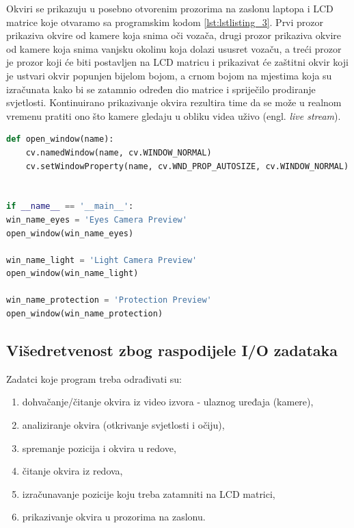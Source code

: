 \documentclass{foi}
\begin{document}
Okviri se prikazuju u posebno otvorenim prozorima na zaslonu laptopa i LCD matrice koje otvaramo sa programskim kodom \ref{lst:lstlisting_3}. Prvi prozor prikaziva okvire od kamere koja snima oči vozača, drugi prozor prikaziva okvire od kamere koja snima vanjsku okolinu koja dolazi ususret vozaču, a treći prozor je prozor koji će biti postavljen na LCD matricu i prikazivat će zaštitni okvir koji je ustvari okvir popunjen bijelom bojom, a crnom bojom na mjestima koja su izračunata kako bi se zatamnio određen dio matrice i spriječilo prodiranje svjetlosti. Kontinuirano prikazivanje okvira rezultira time da se može u realnom vremenu pratiti ono što kamere gledaju u obliku videa uživo (engl. \emph{live stream}).

\newpage
\begin{lstlisting}[language=Python, label={lst:lstlisting_3}, firstnumber=142, style=colored, caption=Otvaranje prozora na zaslonu]
def open_window(name):
    cv.namedWindow(name, cv.WINDOW_NORMAL)
    cv.setWindowProperty(name, cv.WND_PROP_AUTOSIZE, cv.WINDOW_NORMAL)


if __name__ == '__main__':
win_name_eyes = 'Eyes Camera Preview'
open_window(win_name_eyes)

win_name_light = 'Light Camera Preview'
open_window(win_name_light)

win_name_protection = 'Protection Preview'
open_window(win_name_protection)
\end{lstlisting}

\subsection{Višedretvenost zbog raspodijele I/O zadataka}

\flushleft Zadatci koje program treba odrađivati su:
\begin{enumerate}[noitemsep]
    \item dohvačanje/čitanje okvira iz video izvora - ulaznog uređaja (kamere),
    \item analiziranje okvira (otkrivanje svjetlosti i očiju),
    \item spremanje pozicija i okvira u redove,
    \item čitanje okvira iz redova,
    \item izračunavanje pozicije koju treba zatamniti na LCD matrici,
    \item prikazivanje okvira u prozorima na zaslonu.
\end{enumerate}
\end{document}
